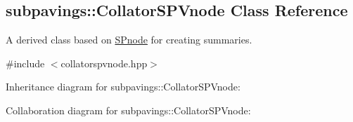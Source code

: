 \hypertarget{classsubpavings_1_1CollatorSPVnode}{\subsection{subpavings\-:\-:\-Collator\-S\-P\-Vnode \-Class \-Reference}
\label{classsubpavings_1_1CollatorSPVnode}
}


\-A derived class based on \hyperlink{classsubpavings_1_1SPnode}{\-S\-Pnode} for creating summaries.  




{\ttfamily \#include $<$collatorspvnode.\-hpp$>$}



\-Inheritance diagram for subpavings\-:\-:\-Collator\-S\-P\-Vnode\-:


\-Collaboration diagram for subpavings\-:\-:\-Collator\-S\-P\-Vnode\-:
